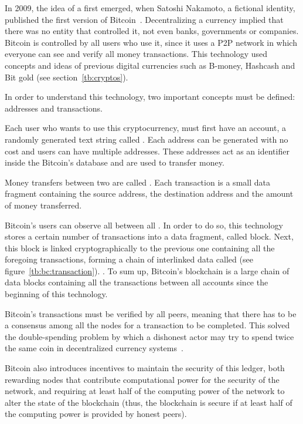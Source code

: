 In 2009, the idea of a  first emerged, when
Satoshi Nakamoto, a fictional identity, published the first version of
Bitcoin~\cite{nakamoto2008bitcoin}. Decentralizing a currency implied that there
was no entity that controlled it, not even banks, governments or companies.
Bitcoin is controlled by all users who use it, since it uses a P2P network in
which everyone can see and verify all money transactions. This technology used
concepts and ideas of previous digital currencies such as B-money, Hashcash and
Bit gold (see section~\ref{tb:cryptos}).

In order to understand this technology, two important concepts must be defined:
addresses and transactions.

Each user who wants to use this cryptocurrency, must first have an account, a
randomly generated text string called . Each address can be
generated with no cost and users can have multiple addresses. These addresses
act as an identifier inside the Bitcoin's database and are used to transfer
money.

Money transfers between two  are called . Each
transaction is a small data fragment containing the source address, the
destination address and the amount of money transferred.

Bitcoin's users can observe all  between all . In
order to do so, this technology stores a certain number of transactions into a
data fragment, called block. Next, this block is linked cryptographically to the
previous one containing all the foregoing transactions, forming a chain of
interlinked data called  (see figure~\ref{tb:bc:transaction}). .
To sum up, Bitcoin's blockchain is a large chain of data blocks containing all
the transactions between all accounts since the beginning of this technology.

Bitcoin's transactions must be verified by all peers, meaning that there has to
be a consensus among all the nodes for a transaction to be completed. This
solved the double-spending problem by which a dishonest actor may try to spend
twice the same coin in decentralized currency systems~\cite{chohan2017double}.

Bitcoin also introduces incentives to maintain the security of this ledger, both
rewarding nodes that contribute computational power for the security of the
network, and requiring at least half of the computing power of the network to
alter the state of the blockchain (thus, the blockchain is secure if at least
half of the computing power is provided by honest peers).


